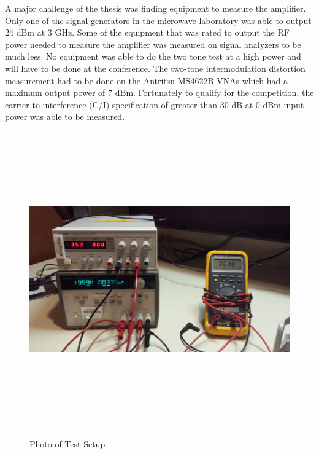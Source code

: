 A major challenge of the thesis was finding equipment to measure the amplifier. Only one of the signal generators in the microwave laboratory was able to output 24 dBm at 3 GHz. Some of the equipment that was rated to output the RF power needed to measure the amplifier was measured on signal analyzers to be much less. No equipment was able to do the two tone test at a high power and will have to be done at the conference. The two-tone intermodulation distortion measurement had to be done on the Antritsu MS4622B VNAs which had a maximum output power of 7 dBm. Fortunately to qualify for the competition, the carrier-to-interference (C/I) specification of greater than 30 dB at 0 dBm input power was able to be measured.

\begin{figure}
  \centering
  \includegraphics[width=5in,height=5in,keepaspectratio]{figures/test/test_setup}\\
  \caption{Photo of Test Setup}
  \label{fig:test_setup}
\end{figure}

